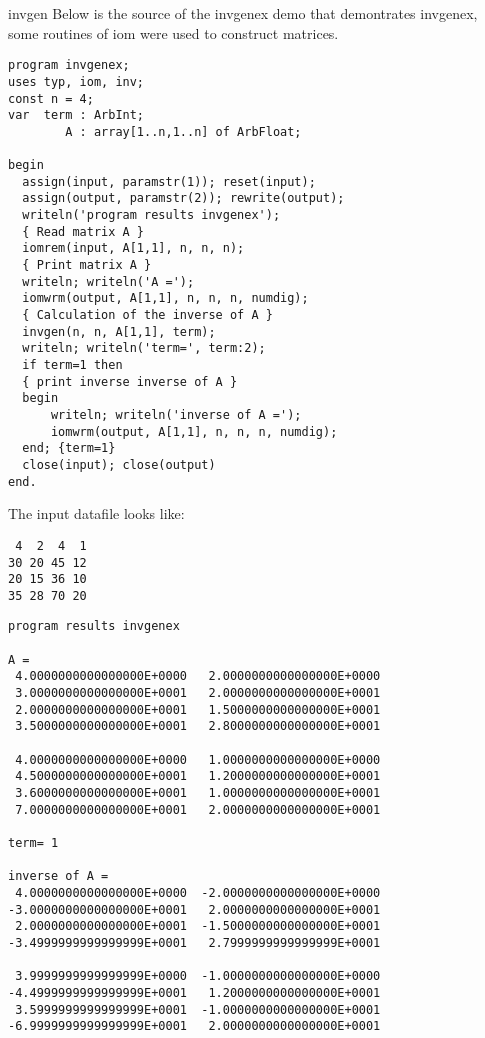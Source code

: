 \documentclass{report}
\newcommand{\ProgramData}{\item[Example Data]\rmfamily}
\newcommand{\ProgramResults}{\item[Example Result]\rmfamily}
\begin{document}
\begin{procedure}{invgen}
Below is the source of the invgenex demo that demontrates invgenex, some
routines of iom were used to construct matrices.

\begin{lstlisting}
program invgenex;
uses typ, iom, inv;
const n = 4;
var  term : ArbInt;
        A : array[1..n,1..n] of ArbFloat;

begin
  assign(input, paramstr(1)); reset(input);
  assign(output, paramstr(2)); rewrite(output);
  writeln('program results invgenex');
  { Read matrix A }
  iomrem(input, A[1,1], n, n, n);
  { Print matrix A }
  writeln; writeln('A =');
  iomwrm(output, A[1,1], n, n, n, numdig);
  { Calculation of the inverse of A }
  invgen(n, n, A[1,1], term);
  writeln; writeln('term=', term:2);
  if term=1 then
  { print inverse inverse of A }
  begin
      writeln; writeln('inverse of A =');
      iomwrm(output, A[1,1], n, n, n, numdig);
  end; {term=1}
  close(input); close(output)
end.
\end{lstlisting}

\ProgramData

The input datafile looks like:
\begin{verbatim}
 4  2  4  1
30 20 45 12
20 15 36 10
35 28 70 20
\end{verbatim}

\ProgramResults

\begin{verbatim}
program results invgenex

A =
 4.0000000000000000E+0000   2.0000000000000000E+0000
 3.0000000000000000E+0001   2.0000000000000000E+0001
 2.0000000000000000E+0001   1.5000000000000000E+0001
 3.5000000000000000E+0001   2.8000000000000000E+0001

 4.0000000000000000E+0000   1.0000000000000000E+0000
 4.5000000000000000E+0001   1.2000000000000000E+0001
 3.6000000000000000E+0001   1.0000000000000000E+0001
 7.0000000000000000E+0001   2.0000000000000000E+0001

term= 1

inverse of A =
 4.0000000000000000E+0000  -2.0000000000000000E+0000
-3.0000000000000000E+0001   2.0000000000000000E+0001
 2.0000000000000000E+0001  -1.5000000000000000E+0001
-3.4999999999999999E+0001   2.7999999999999999E+0001

 3.9999999999999999E+0000  -1.0000000000000000E+0000
-4.4999999999999999E+0001   1.2000000000000000E+0001
 3.5999999999999999E+0001  -1.0000000000000000E+0001
-6.9999999999999999E+0001   2.0000000000000000E+0001
\end{verbatim}


\end{procedure}
\end{document}
